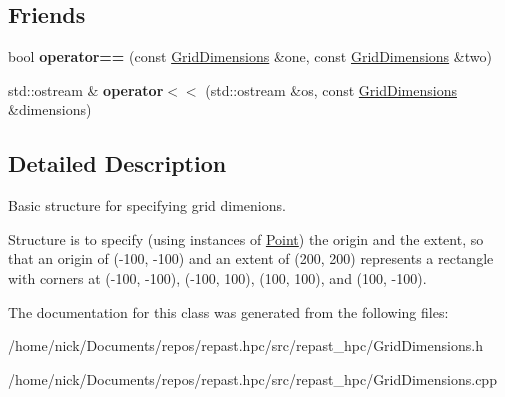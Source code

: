 \subsection*{Friends}
\begin{DoxyCompactItemize}
\item 
\hypertarget{classrepast_1_1_grid_dimensions_aba42531b113bed80dcac86aac0377225}{bool {\bfseries operator==} (const \hyperlink{classrepast_1_1_grid_dimensions}{Grid\-Dimensions} \&one, const \hyperlink{classrepast_1_1_grid_dimensions}{Grid\-Dimensions} \&two)}\label{classrepast_1_1_grid_dimensions_aba42531b113bed80dcac86aac0377225}

\item 
\hypertarget{classrepast_1_1_grid_dimensions_aca04c2784205aba66e1478fdfdbb24db}{std\-::ostream \& {\bfseries operator$<$$<$} (std\-::ostream \&os, const \hyperlink{classrepast_1_1_grid_dimensions}{Grid\-Dimensions} \&dimensions)}\label{classrepast_1_1_grid_dimensions_aca04c2784205aba66e1478fdfdbb24db}

\end{DoxyCompactItemize}


\subsection{Detailed Description}
Basic structure for specifying grid dimenions. 

Structure is to specify (using instances of \hyperlink{classrepast_1_1_point}{Point}) the origin and the extent, so that an origin of (-\/100, -\/100) and an extent of (200, 200) represents a rectangle with corners at (-\/100, -\/100), (-\/100, 100), (100, 100), and (100, -\/100). 

The documentation for this class was generated from the following files\-:\begin{DoxyCompactItemize}
\item 
/home/nick/\-Documents/repos/repast.\-hpc/src/repast\-\_\-hpc/Grid\-Dimensions.\-h\item 
/home/nick/\-Documents/repos/repast.\-hpc/src/repast\-\_\-hpc/Grid\-Dimensions.\-cpp\end{DoxyCompactItemize}
